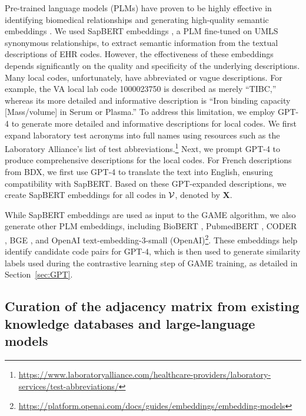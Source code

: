 \documentclass{article}
\def\X{\mathbf{X}}
\begin{document}
Pre-trained language models (PLMs) have proven to be highly effective in identifying biomedical relationships and generating high-quality semantic embeddings \cite{lee2020biobert, shin2020biomegatron, gu2021pubbert,liu-2021-sapbert,yuan2022coder,chen2024bge}. 
We used SapBERT embeddings \cite{liu-2021-sapbert}, a PLM fine-tuned on UMLS synonymous relationships, to extract semantic information from the textual descriptions of EHR codes. However, the effectiveness of these embeddings depends significantly on the quality and specificity of the underlying descriptions. Many local codes, unfortunately, have abbreviated or vague descriptions. For example, the VA local lab code 1000023750 is described as merely ``TIBC,'' whereas its more detailed and informative description is ``Iron binding capacity [Mass/volume] in Serum or Plasma.'' To address this limitation, we employ GPT-4 to generate more detailed and informative descriptions for local codes. We first expand laboratory test acronyms into full names using resources such as the Laboratory Alliance's list of test abbreviations.\footnote{\href{https://www.laboratoryalliance.com/healthcare-providers/laboratory-services/test-abbreviations/}{https://www.laboratoryalliance.com/healthcare-providers/laboratory-services/test-abbreviations/}} Next, we prompt GPT-4 to produce comprehensive descriptions for the local codes. For French descriptions from BDX, we first use GPT-4 to translate the text into English, ensuring compatibility with SapBERT. Based on these GPT-expanded descriptions, we create SapBERT embeddings for all codes in $\mathcal{V}$, denoted by $\X$.


While SapBERT embeddings are used as input to the GAME algorithm, we also generate other PLM embeddings, including BioBERT \citep{lee2020biobert}, PubmedBERT \citep{gu2021pubbert}, CODER \cite{yuan2022coder}, BGE \cite{chen2024bge}, and OpenAI text-embedding-3-small (OpenAI)\footnote{\url{https://platform.openai.com/docs/guides/embeddings/embedding-models}}. These embeddings help identify candidate code pairs for GPT-4, which is then used to generate similarity labels used during the contrastive learning step of GAME training, as detailed in Section~\ref{sec:GPT}.
 

\subsection{Curation of the adjacency matrix from existing knowledge databases and large-language models}
\label{sec:kg}
\end{document}
